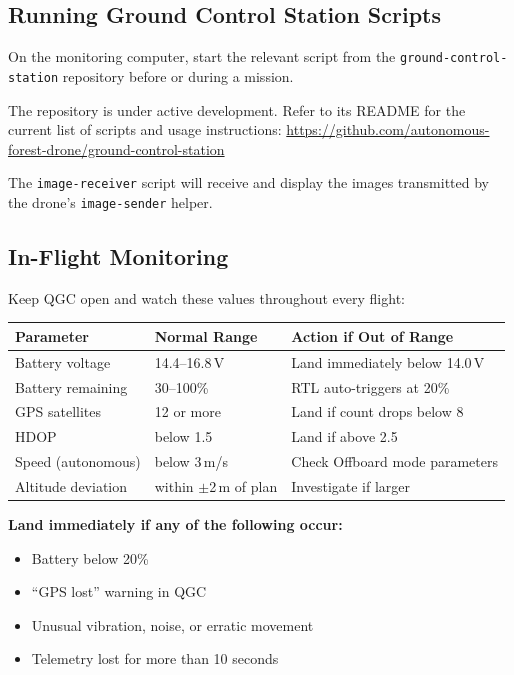 \documentclass{article}
\begin{document}
\subsection{Running Ground Control Station Scripts}

On the monitoring computer, start the relevant script from the \texttt{ground-control-station} repository before or during a mission.

The repository is under active development. Refer to its README for the current list of scripts and usage instructions: \url{https://github.com/autonomous-forest-drone/ground-control-station}

The \texttt{image-receiver} script will receive and display the images transmitted by the drone's \texttt{image-sender} helper.

\subsection{In-Flight Monitoring}

Keep QGC open and watch these values throughout every flight:

\begin{tabular}{lll}
\toprule
\textbf{Parameter} & \textbf{Normal Range} & \textbf{Action if Out of Range} \\
\midrule
Battery voltage & 14.4--16.8\,V & Land immediately below 14.0\,V \\
Battery remaining & 30--100\% & RTL auto-triggers at 20\% \\
GPS satellites & 12 or more & Land if count drops below 8 \\
HDOP & below 1.5 & Land if above 2.5 \\
Speed (autonomous) & below 3\,m/s & Check Offboard mode parameters \\
Altitude deviation & within $\pm$2\,m of plan & Investigate if larger \\
\bottomrule
\end{tabular}

\textbf{Land immediately if any of the following occur:}
\begin{itemize}
    \item Battery below 20\%
    \item ``GPS lost'' warning in QGC
    \item Unusual vibration, noise, or erratic movement
    \item Telemetry lost for more than 10 seconds
\end{itemize}
\end{document}
